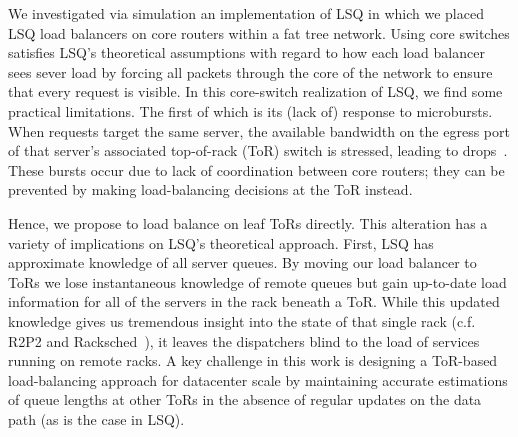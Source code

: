 We investigated via simulation an implementation of LSQ in which we
placed LSQ load balancers on core routers within a fat tree
network. Using core switches satisfies LSQ's theoretical assumptions
with regard to how each load balancer sees sever load by forcing all
packets through the core of the network to ensure that every request
is visible.  In this core-switch realization of LSQ, we find some
practical limitations.  The first of which is its (lack of) response
to microbursts. When requests target the same server, the available
bandwidth on the egress port of that server's associated top-of-rack
(ToR) switch is stressed, leading to drops~\cite{facebook_microburst}. These bursts
occur due to lack of coordination between core routers; they can be
prevented by making load-balancing decisions at the ToR instead.

Hence, we propose to load balance on leaf ToRs directly. This
alteration has a variety of implications on LSQ's theoretical
approach. First, LSQ has approximate knowledge of all server
queues. By moving our load balancer to ToRs we lose instantaneous
knowledge of remote queues but gain up-to-date load information for
all of the servers in the rack beneath a ToR.  While this updated
knowledge gives us tremendous insight into the state of that single
rack (c.f. R2P2 and Racksched~\cite{r2p2, racksched}), it leaves the
dispatchers blind to the load of services running on remote racks.
A key challenge in this work is designing a ToR-based load-balancing
approach for datacenter scale by maintaining accurate estimations of
queue lengths at other ToRs in the absence of regular updates on the
data path (as is the case in LSQ).




